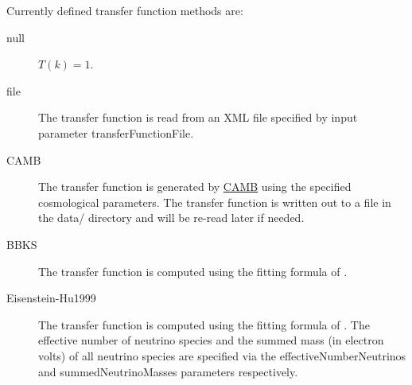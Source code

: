 Currently defined transfer function methods are:
\begin{description}
 \item [{\normalfont \ttfamily null}] $T(k)=1$.
 \item [{\normalfont \ttfamily file}] The transfer function is read from an XML file specified by input parameter {\normalfont \ttfamily transferFunctionFile}.
 \item [{\normalfont \ttfamily CAMB}] The transfer function is generated by \href{http://camb.info/}{\normalfont \scshape CAMB} using the specified cosmological parameters. The transfer function is written out to a file in the {\normalfont \ttfamily data/} directory and will be re-read later if needed.
 \item [{\normalfont \ttfamily BBKS}] The transfer function is computed using the fitting formula of \cite{bardeen_statistics_1986}.
 \item [{\normalfont \ttfamily Eisenstein-Hu1999}] The transfer function is computed using the fitting formula of \cite{eisenstein_power_1999}. The effective number of neutrino species and the summed mass (in electron volts) of all neutrino species are specified via the {\normalfont \ttfamily effectiveNumberNeutrinos} and {\normalfont \ttfamily summedNeutrinoMasses} parameters respectively.
\end{description}

